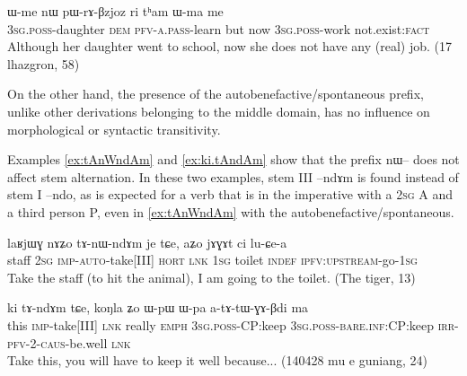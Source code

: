 \documentclass[oldfontcommands,oneside,a4paper,11pt]{article}
\newcommand{\ipa}[1]{{\phon \mbox{#1}}} %
\begin{document}
 \begin{exe}
\ex \label{ex:pWrABzjoz}
\gll 
\ipa{ɯ-me} 	\ipa{nɯ} 	\ipa{pɯ-rɤ-βzjoz} 	\ipa{ri} 	\ipa{tʰam} 	\ipa{ɯ-ma} 	\ipa{me} \\
\textsc{3sg.poss}-daughter \textsc{dem} \textsc{pfv-a.pass}-learn but now \textsc{3sg.poss}-work not.exist:\textsc{fact} \\
\glt Although her daughter went to school, now she does not have any (real) job. (17 lhazgron, 58)
\end{exe}

On the other hand, the presence of the autobenefactive/spontaneous prefix, unlike other derivations belonging to the middle domain, has no influence on  morphological or syntactic transitivity. 
 
 Examples \ref{ex:tAnWndAm} and \ref{ex:ki.tAndAm} show that the prefix \ipa{nɯ--} does not affect stem alternation. In these two examples, stem III   \ipa{--ndɤm} is found instead of stem I \ipa{--ndo}, as is expected for a verb that is in the imperative with a \textsc{2sg} A and a third person P, even in \ref{ex:tAnWndAm} with the autobenefactive/spontaneous.
 

 \begin{exe}
\ex \label{ex:tAnWndAm}
\gll
\ipa{laʁjɯɣ} 	\ipa{nɤʑo} 	\ipa{tɤ-nɯ-ndɤm} 	\ipa{je} 	\ipa{tɕe,} 	\ipa{aʑo} 	\ipa{jɤɣɤt} 	\ipa{ci} 	\ipa{lu-ɕe-a} 	\\
staff \textsc{2sg} \textsc{imp-auto}-take[III] \textsc{hort} \textsc{lnk} \textsc{1sg} toilet \textsc{indef} \textsc{ipfv:upstream}-go-\textsc{1sg} \\
\glt Take the staff (to hit the animal), I am going to the toilet. (The tiger, 13) 
\end{exe}

 \begin{exe}
\ex \label{ex:ki.tAndAm}
\gll
\ipa{ki}  	\ipa{tɤ-ndɤm}  	\ipa{tɕe,}  	\ipa{koŋla}  	\ipa{ʑo}   \ipa{ɯ-pɯ}  	\ipa{ɯ-pa}  	\ipa{a-tɤ-tɯ-ɣɤ-βdi}  	\ipa{ma}  \\
this \textsc{imp}-take[III] \textsc{lnk} really \textsc{emph} \textsc{3sg.poss}-CP:keep \textsc{3sg.poss}-\textsc{bare.inf}:CP:keep \textsc{irr-pfv-2-caus}-be.well \textsc{lnk} \\
\glt Take this, you will have to keep it well because... (140428 mu e guniang, 24)
\end{exe}
\end{document}
